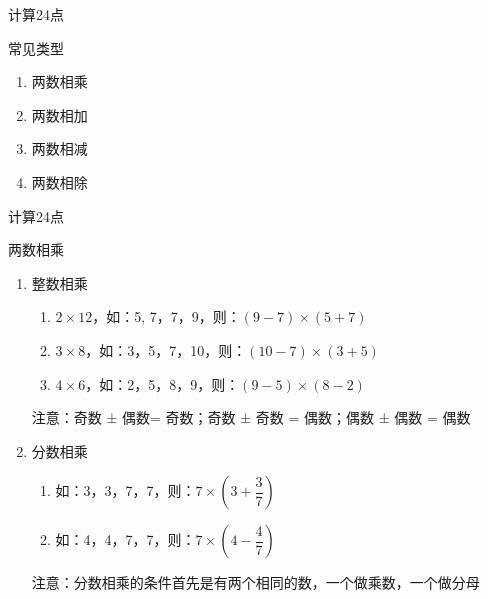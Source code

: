 \documentclass[aspectratio=169]{ctexbeamer} %
\date{\today}
\begin{document}
\begin{frame}[t]{计算24点}
\begin{spacing}{1.2}
\normalsize
\alert{常见类型}
\begin{enumerate}[label={\arabic*.}]
\item 两数相乘
\item 两数相加
\item 两数相减
\item 两数相除
\end{enumerate}
\end{spacing}
\end{frame}

\begin{frame}[t]{计算24点}
\begin{spacing}{1.5}
\normalsize
\alert{两数相乘}
\begin{enumerate}[label={\arabic*.}]
\item 整数相乘
	\begin{enumerate}[label={\Alph*.}]
	\item $2 \times 12$，如：5, 7，7，9，则：$(9-7) \times (5+7)$
	\item $3 \times 8$，如：3，5，7，10，则：$(10-7) \times (3+5)$
	\item $4 \times 6$，如：2，5，8，9，则：$(9-5) \times (8-2)$
	\end{enumerate}
	\alert{注意：奇数 ± 偶数= 奇数；奇数 ± 奇数 = 偶数；偶数 ± 偶数 = 偶数}
\item 分数相乘
	\begin{enumerate}[label={\Alph*.}]
	\item 如：3，3，7，7，则：$7 \times \left( 3 + \dfrac{3}{7} \right)$
	\item 如：4，4，7，7，则：$7 \times \left(4 - \dfrac{4}{7} \right)$
	\end{enumerate}
	\alert{注意：分数相乘的条件首先是有两个相同的数，一个做乘数，一个做分母}
\end{enumerate}
\end{spacing}
\end{frame}
\end{document}
